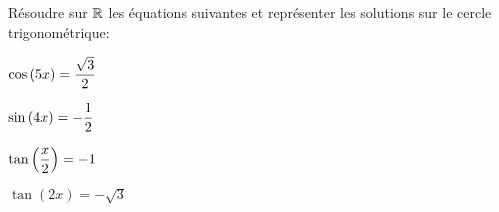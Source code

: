 \documentclass[a4paper, 11pt]{article}
\begin{document}
\begin{exercice}  \;
R\'esoudre sur $\mathbb{R}$ les \'equations suivantes et repr\'esenter les solutions sur le cercle trigonom\'etrique:
\begin{enumerate}
\begin{minipage}[t]{0.45\textwidth}
\item $\cos{(5x)}=\displaystyle\frac{\sqrt{3}}{2}$
\item $\sin{(4x)}=-\displaystyle\frac{1}{2}$
\end{minipage}
\begin{minipage}[t]{0.45\textwidth}
\item $\tan{\left(\displaystyle\frac{x}{2}\right)}=-1$
\item $\tan{(2x)}=-\sqrt{3}$
\end{minipage}
\end{enumerate}
\end{exercice}
\end{document}
